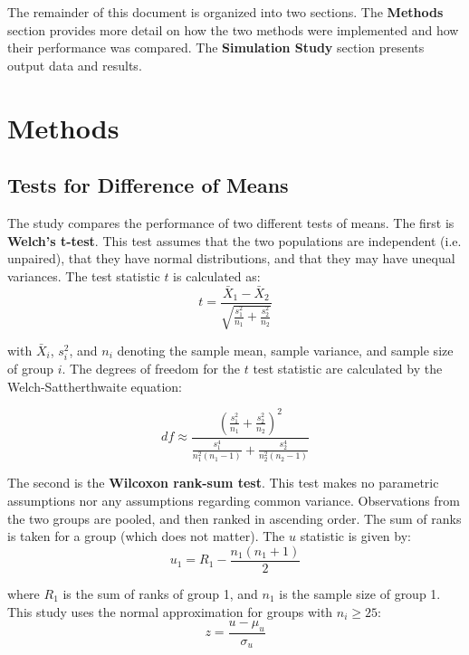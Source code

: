 \documentclass{report}
\begin{document}
The remainder of this document is organized into two sections. The
\textbf{Methods} section provides more detail on how the two methods were
implemented and how their performance was compared. The \textbf{Simulation
Study} section presents output data and results.

\section*{Methods}

\subsection*{Tests for Difference of Means}
The study compares the performance of two different tests of means. The first
is \textbf{Welch's t-test}. This test assumes that the two populations
are independent (i.e. unpaired), that they have normal distributions, and that
they may have unequal variances. The test statistic $t$ is calculated as:
\begin{equation}
	t = \frac{\bar{X}_1 - \bar{X}_2}{\sqrt{\frac{s^2_1}{n_1} + \frac{s^2_2}{n_2}}}
\end{equation}

with $\bar{X}_i$, $s^2_i$, and $n_i$ denoting the sample mean, sample variance, and
sample size of group $i$. The degrees of freedom for the $t$ test statistic are
calculated by the Welch-Sattherthwaite equation:

\begin{equation}
	df \approx \frac{\left(\frac{s^2_1}{n_1} + \frac{s^2_2}{n_2}
	\right)^2}{\frac{s^4_1}{n^2_1(n_1 - 1)} + \frac{s^4_2}{n^2_2(n_2 - 1)}}
\end{equation}

The second is the \textbf{Wilcoxon rank-sum test}. This test makes no parametric
assumptions nor any assumptions regarding common variance. Observations from the
two groups are pooled, and then ranked in ascending order. The sum of ranks is
taken for a group (which does not matter). The $u$ statistic is given by:
\begin{equation}
	u_1 = R_1 - \frac{n_1(n_1 + 1)}{2} 
\end{equation}

where $R_1$ is the sum of ranks of group 1, and $n_1$ is the sample size of
group 1. This study uses the normal approximation for groups with $n_i\geq25$:
\begin{equation}
	z = \frac{u - \mu_u}{\sigma_u}
\end{equation}
\end{document}
